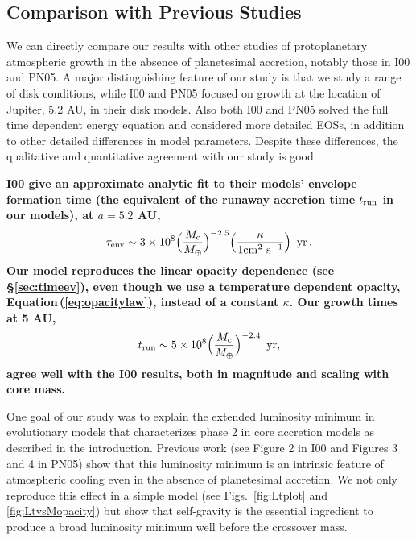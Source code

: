 \documentclass[apj, numberedappendix]{emulateapj}
\newcommand{\Eq}[1]{Equation\,(\ref{#1})}
\newcommand{\Figs}[2]{Figs.~\ref{#1} and \ref{#2}}
\newcommand{\co}{_{\rm c}}
\begin{document}
\subsection{\textbf{Comparison with Previous Studies}}
\label{sec:comp}

We can directly compare our results with other studies of protoplanetary atmospheric growth in the absence of planetesimal accretion, notably those in I00 and PN05.  A major distinguishing feature of our study is that we study a range of disk conditions, while I00 and PN05 focused on growth at the location of Jupiter, 5.2 AU, in their disk models.  Also both I00 and PN05 solved the full time dependent energy equation and considered more detailed EOSs, in addition to other detailed differences in model parameters.  Despite these differences, the qualitative and quantitative agreement with our study is good. 

\textbf{I00 give an approximate analytic fit to their models' envelope formation time (the equivalent of the runaway accretion time $t_{\rm run}$ in our models), at $a=5.2$ AU, }
\begin{equation}
\label{eq:tauenv}
\tau_{\rm env} \sim 3 \times 10^8 \Big(\frac{M\co}{M_{\oplus}}\Big)^{-2.5} \Big(\frac{\kappa}{1 \text{cm$^2$ s$^{-1}$}}\Big) \,\,\, \text{yr}\, .
\end{equation}
\textbf{Our model reproduces the linear opacity dependence (see \S\ref{sec:timeev}), even though we use a temperature dependent opacity, \Eq{eq:opacitylaw}, instead of a constant $\kappa$.  Our growth times at 5 AU,} 
\begin{equation}
\label{eq:trun5au}
t_{\rm run} \sim 5 \times 10^8 \Big(\frac{M\co}{M_{\oplus}}\Big)^{-2.4} \,\,\, \text{yr},
\end{equation} 
\textbf{agree well with the I00 results, both in magnitude and scaling with core mass.}

One goal of our study was to explain the extended luminosity minimum in evolutionary models that characterizes phase 2 in core accretion models as described in the introduction.  Previous work (see Figure 2 in I00 and Figures 3 and 4 in PN05) show that this luminosity minimum is an intrinsic feature of atmospheric cooling even in the absence of planetesimal accretion.  We not only reproduce this effect in a simple model (see \Figs{fig:Ltplot}{fig:LtvsMopacity}) but show that self-gravity is the essential ingredient to produce a broad luminosity minimum well before the crossover mass.  
\end{document}
